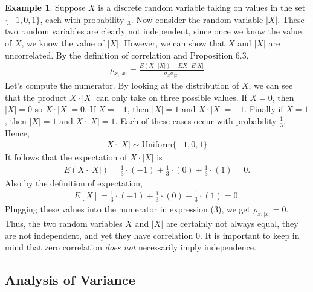 \documentclass[11pt,letterpaper]{article}
\numberwithin{theorem}{section}
\numberwithin{definition}{section}
\numberwithin{lemma}{section}
\numberwithin{corollary}{section}
\numberwithin{proposition}{section}
\theoremstyle{definition}
\numberwithin{remark}{section}
\numberwithin{claim}{section}
\numberwithin{observation}{section}
\numberwithin{fact}{section}
\numberwithin{assumption}{section}
\newtheorem{example}[theorem]{Example}
\numberwithin{example}{section}
\numberwithin{exercise}{section}
\begin{document}
\begin{example}
Suppose $X$ is a discrete random variable taking on values in the set $\{-1,0,1\}$, each with probability $\frac{1}{3}$. Now consider the random variable $|X|$. These two random variables are clearly not independent, since once we know the value of $X$, we know the value of $|X|$. However, we can show that $X$ and $|X|$ are uncorrelated. By the definition of correlation and Proposition 6.3,
\begin{align}
\rho_{x,|x|} = \frac{E(X\cdot |X|) - EX \cdot E|X|}{\sigma_x \sigma_{|x|}}
\end{align}
Let's compute the numerator. By looking at the distribution of $X$, we can see that the product $X \cdot |X|$ can only take on three possible values. If $X = 0$, then $|X| = 0$ so $X \cdot |X| = 0$. If $X = -1$, then $|X| = 1$ and $X \cdot |X| = -1$. Finally if $X = 1$, then $|X| = 1$ and $X \cdot |X| = 1$. Each of these cases occur with probability $\frac{1}{3}$. Hence,
\begin{align*}
X \cdot |X| \sim \text{Uniform}\{-1,0,1\}
\end{align*}
It follows that the expectation of $X \cdot |X|$ is
\begin{align*}
E(X \cdot |X|) = \frac{1}{3} \cdot (-1) + \frac{1}{3} \cdot (0) + \frac{1}{3} \cdot (1) = 0.
\end{align*}
Also by the definition of expectation,
\begin{align*}
E[X] = \frac{1}{3} \cdot (-1) + \frac{1}{3} \cdot (0) + \frac{1}{3} \cdot (1) = 0.
\end{align*}
Plugging these values into the numerator in expression (3), we get $\rho_{x,|x|} = 0$. Thus, the two random variables $X$ and $|X|$ are certainly not always equal, they are not independent, and yet they have correlation 0. It is important to keep in mind that zero correlation \textit{does not} necessarily imply independence.
\end{example}


\newpage
\subsection{Analysis of Variance}
\end{document}
